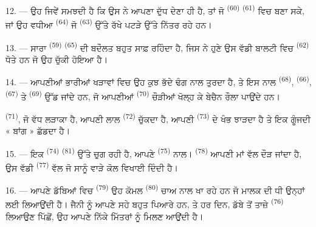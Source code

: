 12. --- ਉਹ ਜਿਵੇਂ ਸਮਝਦੀ ਹੈ ਕਿ ਉਸ ਨੇ ਆਪਣਾ ਦੁੱਧ ਦੇਣਾ ਹੀ ਹੈ, ਤਾਂ ਜੋ
 \textsuperscript{(60)} 
\textsuperscript{(61)} ਵਿਚ  ਬਣਾ ਸਕੇ, ਜਾਂ ਉਹ ਵਧੀਆ 
\textsuperscript{(64)} ਜੋ  \textsuperscript{(63)} ਉੱਤੇ ਰੱਖੇ ਪਟੜੇ ਉੱਤੇ
ਨਿੱਤਰ ਰਹੇ ਹਨ।

13. --- ਸਾਰਾ  \textsuperscript{(59)} 
\textsuperscript{(65)} ਦੀ ਬਦੌਲਤ ਬਹੁਤ ਸਾਫ਼ ਰਹਿੰਦਾ ਹੈ, ਜਿਸ ਨੇ ਹੁਣੇ ਉਸ ਵੱਡੀ ਬਾਲਟੀ
ਵਿਚ  \textsuperscript{(62)} ਧੋਤੇ ਹਨ ਜੋ ਉਹ ਚੁੱਕੀ ਹੋਇਆ ਹੈ।

\VUsaut{3.0mm}
\VUsaut{3.0mm}

14. --- ਆਪਣੀਆਂ ਭਾਰੀਆਂ ਖੜਾਵਾਂ ਵਿਚ ਉਹ ਕੁਝ ਭੱਦੇ ਢੰਗ ਨਾਲ ਤੁਰਦਾ ਹੈ, ਤੇ ਇਸ ਨਾਲ
 \textsuperscript{(68)},  \textsuperscript{(66)},
 \textsuperscript{(67)} ਤੇ  \textsuperscript{(69)}
ਉੱਡ ਜਾਂਦੇ ਹਨ, ਜੋ ਆਪਣੀਆਂ  \textsuperscript{(70)} ਚੌੜੀਆਂ ਖੋਲ੍ਹ ਕੇ ਬੇਚੈਨ
ਰੌਲਾ ਪਾਉਂਦੇ ਹਨ।

 \textsuperscript{(71)}, ਜੋ ਵੱਧ ਲੜਾਕਾ ਹੈ, ਆਪਣੀ ਲਾਲ 
\textsuperscript{(72)} ਚੁੱਕਦਾ ਹੈ, ਆਪਣੀ  \textsuperscript{(73)} ਦੇ ਖੰਭ
ਝਾੜਦਾ ਹੈ ਤੇ ਇਕ ਗੂੰਜਦੀ « ਬਾਂਗ » ਛੱਡਦਾ ਹੈ।

15. --- ਇਕ  \textsuperscript{(74)} 
\textsuperscript{(81)} ਉੱਤੇ ਚੁਗ ਰਹੀ ਹੈ, ਆਪਣੇ 
\textsuperscript{(75)} ਨਾਲ।  \textsuperscript{(78)} ਆਪਣੀ ਮਾਂ ਵੱਲ
ਦੌੜ ਜਾਂਦਾ ਹੈ, ਉਸ ਵੱਡੀ  \textsuperscript{(77)} ਵੱਲ ਜੋ ਸਾਨੂੰ ਵਾੜੇ ਕੋਲ
ਵਿਖਾਈ ਦਿੰਦੀ ਹੈ।

16. --- ਆਪਣੇ ਡੱਬਿਆਂ ਵਿਚ  \textsuperscript{(79)} ਉਹ ਕੋਮਲ 
\textsuperscript{(80)} ਚਾਅ ਨਾਲ ਖਾ ਰਹੇ ਹਨ ਜੋ ਮਾਲਕ ਦੀ ਧੀ ਉਨ੍ਹਾਂ ਲਈ ਲਿਆਉਂਦੀ ਹੈ। ਜੈਨੀ
ਨੂੰ ਆਪਣੇ ਸਹੇ ਬਹੁਤ ਪਿਆਰੇ ਹਨ, ਤੇ ਹਰ ਦਿਨ, ਡੱਬੇ ਤੋਂ ਤਾਜ਼ੇ 
\textsuperscript{(76)} ਲਿਆਉਣ ਪਿੱਛੋਂ, ਉਹ ਆਪਣੇ ਨਿੱਕੇ ਮਿੱਤਰਾਂ ਨੂੰ ਮਿਲਣ ਆਉਂਦੀ ਹੈ।
\VUsaut{6.0mm}
\VUfilet{22mm}
